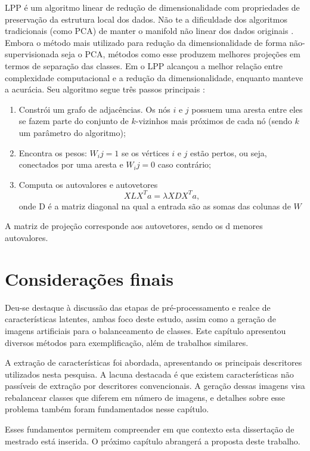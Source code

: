 LPP é um algoritmo linear de redução de dimensionalidade com propriedades de preservação da estrutura local dos dados. Não te a dificuldade dos algoritmos tradicionais (como PCA) de manter o manifold não linear dos dados originais \cite{Zhuo2014}. Embora o método mais utilizado para redução da dimensionalidade de forma não-supervisionada seja o PCA, métodos como esse produzem melhores projeções em termos de separação das classes. Em \cite{Zhuo2014} o LPP alcançou a melhor relação entre complexidade computacional e a redução da dimensionalidade, enquanto manteve a acurácia. Seu algoritmo segue três passos principais \cite{He2004}:

\begin{enumerate}
\item Constrói um grafo de adjacências. Os nós $i$ e $j$ possuem uma aresta entre eles se fazem parte do conjunto de $k$-vizinhos mais próximos de cada nó (sendo $k$ um parâmetro do algoritmo);

\item Encontra os pesos: $W_ij = 1$ se os vértices $i$ e $j$ estão pertos, ou seja, conectados por uma aresta e $W_ij = 0$ caso contrário;

\item Computa os autovalores e autovetores
\begin{equation}
    X L X^T a = \lambda X D X^T a,
\end{equation}
\noindent onde D é a matriz diagonal na qual a entrada são as somas das colunas de $W$
\end{enumerate}

A matriz de projeção corresponde aos autovetores, sendo os d menores autovalores.

\section{Considerações finais}

Deu-se destaque à discussão das etapas de pré-processamento e realce de características latentes, ambas foco deste estudo, assim como a geração de imagens artificiais para o balanceamento de classes. Este capítulo apresentou diversos métodos para exemplificação, além de trabalhos similares.

A extração de características foi abordada, apresentando os principais descritores utilizados nesta pesquisa. A lacuna destacada é que existem características não passíveis de extração por descritores convencionais.
A geração dessas imagens visa rebalancear classes que diferem em número de imagens, e detalhes sobre esse problema também foram fundamentados nesse capítulo.

Esses fundamentos permitem compreender em que contexto esta dissertação de mestrado está inserida. O próximo capítulo abrangerá a proposta deste trabalho.
